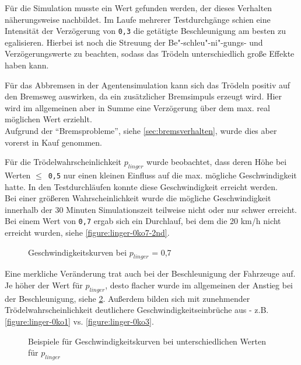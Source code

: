 Für die Simulation musste ein Wert gefunden werden, der dieses Verhalten näherungsweise nachbildet.
Im Laufe mehrerer Testdurchgänge schien eine Intensität der Verzögerung von \texttt{0,3} die getätigte Beschleunigung am besten zu egalisieren. 
Hierbei ist noch die Streuung der Be"-schleu"-ni"-gungs- und Verzögerungswerte zu beachten, sodass das Trödeln unterschiedlich große Effekte haben kann.

Für das Abbremsen in der Agentensimulation kann sich das Trödeln positiv auf den Bremsweg auswirken, da ein zusätzlicher Bremsimpuls erzeugt wird. 
Hier wird im allgemeinen aber in Summe eine Verzögerung über dem max. real möglichen Wert erziehlt.
\\
Aufgrund der \enquote{Bremsprobleme}, siehe \cref{sec:bremsverhalten}, wurde dies aber vorerst in Kauf genommen.

Für die Trödelwahrscheinlichkeit $ p_{linger} $ wurde beobachtet, dass deren Höhe bei Werten \mbox{$\leq$ \texttt{0,5}} nur einen kleinen Einfluss auf die max. mögliche Geschwindigkeit hatte.
In den Testdurchläufen konnte diese Geschwindigkeit erreicht werden.
\\
Bei einer größeren Wahrscheinlichkeit wurde die mögliche Geschwindigkeit innerhalb der 30 Minuten Simulationszeit teilweise nicht oder nur schwer erreicht.
Bei einem Wert von \texttt{0,7} ergab sich ein Durchlauf, bei dem die 20 km/h nicht erreicht wurden, siehe \cref{figure:linger-0ko7-2nd}.

\begin{figure}[hptb]
  \centering 
   \qquad
   \qquad
  \caption{Geschwindigkeitskurven bei $p_{linger}$ = 0,7}
  \label{figure:linger-0ko7}
\end{figure}

Eine merkliche Veränderung trat auch bei der Beschleunigung der Fahrzeuge auf.
Je höher der Wert für $ p_{linger} $, desto flacher wurde im allgemeinen der Anstieg bei der Beschleunigung, siehe \cref{figure:linger-0ko1-3-5}.
Außerdem bilden sich mit zunehmender Trödelwahrscheinlichkeit deutlichere Geschwindigkeitseinbrüche aus - z.B. \cref{figure:linger-0ko1} vs. \cref{figure:linger-0ko3}.

\begin{figure}[hptb]
  \centering 
   \qquad
   \qquad
  \caption{Beispiele für Geschwindigkeitskurven bei unterschiedlichen Werten für $p_{linger}$}
  \label{figure:linger-0ko1-3-5}
\end{figure}


